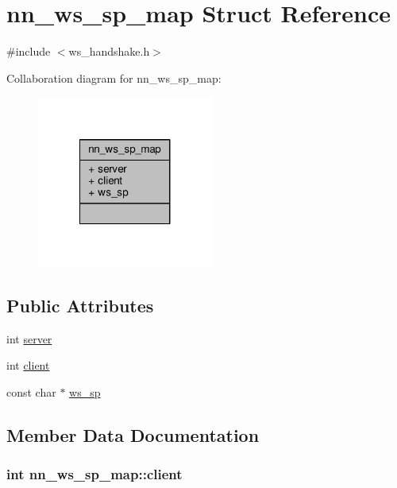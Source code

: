 \hypertarget{structnn__ws__sp__map}{}\section{nn\+\_\+ws\+\_\+sp\+\_\+map Struct Reference}
\label{structnn__ws__sp__map}


{\ttfamily \#include $<$ws\+\_\+handshake.\+h$>$}



Collaboration diagram for nn\+\_\+ws\+\_\+sp\+\_\+map\+:\nopagebreak
\begin{figure}[H]
\begin{center}
\leavevmode
\includegraphics[width=164pt]{structnn__ws__sp__map__coll__graph}
\end{center}
\end{figure}
\subsection*{Public Attributes}
\begin{DoxyCompactItemize}
\item 
int \hyperlink{structnn__ws__sp__map_a91d745d75b88332cd8dfd9a2f5cd59fc}{server}
\item 
int \hyperlink{structnn__ws__sp__map_a25830cf7a2ef07bd965bcc92d5499efc}{client}
\item 
const char $\ast$ \hyperlink{structnn__ws__sp__map_ab9ef6abcd447dbcd233458e0f08eaeb6}{ws\+\_\+sp}
\end{DoxyCompactItemize}


\subsection{Member Data Documentation}
\subsubsection[{client}]{\setlength{\rightskip}{0pt plus 5cm}int nn\+\_\+ws\+\_\+sp\+\_\+map\+::client}\hypertarget{structnn__ws__sp__map_a25830cf7a2ef07bd965bcc92d5499efc}{}\label{structnn__ws__sp__map_a25830cf7a2ef07bd965bcc92d5499efc}
